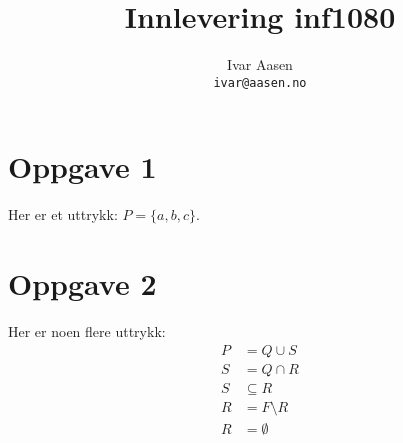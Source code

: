 \documentclass[norsk,a4paper]{article}
\title{Innlevering inf1080}
\author{Ivar Aasen\\ \texttt{ivar@aasen.no}}
\begin{document}
\maketitle

\section*{Oppgave 1}

Her er et uttrykk: $P = \{a, b, c \}$.

\section*{Oppgave 2}
Her er noen flere uttrykk:
\begin{align*}
	P &= Q \cup S \\
	S &= Q \cap R \\
	S &\subseteq R \\
	R &= F \setminus R \\ 
	R &= \emptyset
\end{align*}
\end{document}
